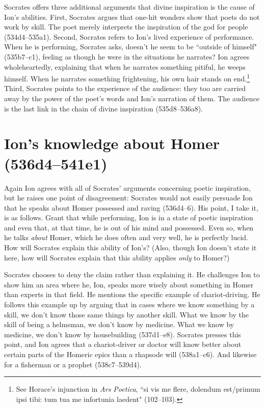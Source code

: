 \documentclass[11pt,letterpaper]{article}
\begin{document}
Socrates offers three additional arguments that divine inspiration is the cause of Ion's abilities. First, Socrates argues that one-hit wonders show that poets do not work by skill. The poet merely interprets the inspiration of the god for people (534d4--535a1). Second, Socrates refers to Ion's lived experience of performance. When he is performing, Socrates asks, doesn't he seem to be ``outside of himself" (535b7--c1), feeling as though he were in the situations he narrates? Ion agrees wholeheartedly, explaining that when he narrates something pitiful, he weeps himself. When he narrates something frightening, his own hair stands on end.\footnote{See Horace's injunction in \textit{Ars Poetica}, ``si vis me flere, dolendum est/primum ipsi tibi: tum tua me infortunia laedent" (102--103).}  Third, Socrates points to the experience of the audience: they too are carried away by the power of the poet's words and Ion's narration of them. The audience is the last link in the chain of divine inspiration (535d8--536a8).


\section{Ion's knowledge about Homer (536d4--541e1)}

Again Ion agrees with all of Socrates' arguments concerning poetic
inspiration, but he raises one point of disagreement: Socrates would not
easily persuade Ion that he speaks about Homer possessed and raving
(536d4--6). His point, I take it, is as follows. Grant that while
performing, Ion is in a state of poetic inspiration and even that, at that
time, he is out of his mind and possessed. Even so, when he talks
\emph{about} Homer, which he does often and very well, he is perfectly
lucid. How will Socrates explain this ability of Ion's? (Also, though Ion
doesn't state it here, how will Socrates explain that this ability applies
\emph{only} to Homer?)

Socrates chooses to deny the claim rather than explaining it. He challenges Ion to show him an area where he, Ion, speaks more wisely about something in Homer than experts in that field. He mentions the specific example of chariot-driving. He follows this example up by arguing that in cases where we know something by a skill, we don't know those same things by another skill. What we know by the skill of being a helmsman, we don't know by medicine. What we know by medicine, we don't know by housebuilding (537d1--e8). Socrates presses this point, and Ion agrees that a chariot-driver or doctor will know better about certain parts of the Homeric epics than a rhapsode will (538a1--c6). And likewise for a fisherman or a prophet (538c7--539d4).
\end{document}
